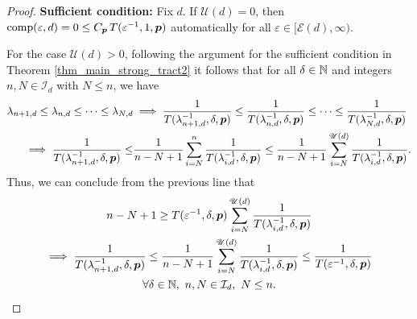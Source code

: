 \documentclass[sort&compress]{elsarticle}
\newcommand{\thed}{\delta}
\newcommand{\theM}{\mathscr{E}}
\newcommand{\theUB}{\mathscr{U}}
\renewcommand{\hI}{\mathcal{I}}
\begin{document}
\begin{proof}
\textbf{Sufficient condition:}\newline
Fix $d$.  If $\theUB(d) = 0$, then $\operatorname{comp}(\varepsilon,d) = 0 \le C_{\boldsymbol{p}}\, T(\varepsilon^{-1},1,\boldsymbol{p})$ automatically for all $\varepsilon \in [\theM(d), \infty)$.

For the case $\theUB(d)> 0$, following the argument for the sufficient condition in Theorem \ref{thm_main_strong_tract2} it follows that for all $\thed \in \naturals$ and integers $n, N \in \hI_d$  with $N \le n$, we have
\begin{align*}
    \lambda_{n+1,d} \le \lambda_{n,d} \le \cdots \le \lambda_{N,d}
    & \implies \frac{1}{T(\lambda_{n+1, d}^{-1},\thed,\vp)} \le \frac{1}{T(\lambda_{n, d}^{-1},\thed,\vp)} \le \cdots \le \frac{1}{T(\lambda_{N, d}^{-1},\thed,\vp)} \\
     \implies \frac{1}{T(\lambda_{n+1, d}^{-1},\thed,\vp) }
    \le &\frac{1}{n-N+1} \sum_{i=N}^n  \frac{1}{T(\lambda_{i, d}^{-1},\thed,\vp) }
    \le \frac{1}{n-N+1} \sum_{i=N}^{\theUB(d)}  \frac{1}{T(\lambda_{i, d}^{-1},\thed,\vp)}.
\end{align*}
Thus, we can conclude from the previous line that
\begin{multline} \label{eq:implicate_a_rest}
    n - N +1 \ge T(\varepsilon^{-1},\thed,\vp) \sum_{i=N}^{\theUB(d)} \frac{1}{T(\lambda_{i, d}^{-1},\thed,\vp)} \\
   \implies   \frac{1}{T(\lambda_{n+1, d}^{-1},\thed,\vp)} \le
   \frac{1}{n-N+1} \sum_{i=N}^{\theUB(d)} \frac{1}{T(\lambda_{i, d}^{-1},\thed,\vp) } \le \frac{1}{T(\varepsilon^{-1},\thed,\vp)} \\ \forall \thed \in \naturals,\  n, N \in \hI_d,   \ N \le n.
\end{multline}


\end{proof}
\end{document}
